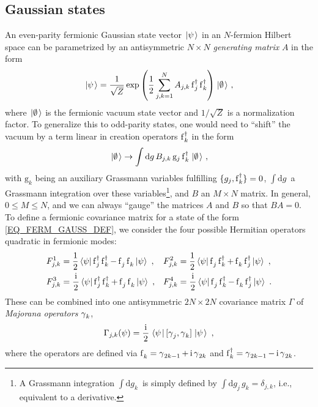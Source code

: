 \documentclass[letter]{article}
\newcommand{\intd}[1]{\int\mathrm{d}#1\,}
\begin{document}
\subsection{Gaussian states}
An even-parity fermionic Gaussian state vector $\left.\left|{\psi}\right.\right\rangle$ in an $N$-fermion Hilbert space can be parametrized by an antisymmetric $N \times N$ \emph{generating matrix} $A$ in the form
\begin{equation}
\label{EQ_FERM_GAUSS_DEF}
\left.\left|{\psi}\right.\right\rangle = \frac{1}{\sqrt{Z}} \exp\left( \frac{1}{2} \sum_{j,k=1}^N A_{j,k} \operatorname{f}^\dagger_j \operatorname{f}^\dagger_k \right) {\left.\left|{\emptyset}\right.\right\rangle} \ ,
\end{equation}
where ${\left.\left|{\emptyset}\right.\right\rangle}$ is the fermionic vacuum state vector and $1/\sqrt{Z}$ is a normalization factor. To generalize this to odd-parity states, one would need to ``shift'' the vacuum by a term linear in creation operators $\operatorname{f}^\dagger_k$ in the form
\begin{equation}
\vacket \to \intd g B_{j,k}\, \mathrm{g}_j \fd_k \vacket \ ,
\end{equation}
with $\mathrm{g}_k$ being an auxiliary Grassmann variables fulfilling $\{ g_j, \operatorname{f}^\dagger_k \} = 0$, $\intd g$ a Grassmann integration over these variables\footnote{A Grassmann integration $\intd{g_k}$ is simply defined by $\intd{g_j} g_k = \delta_{j,k}$, i.e., equivalent to a derivative.}, and $B$ an $M \times N$ matrix. In general, $0 \leq M \leq N$, and we can always ``gauge'' the matrices $A$ and $B$ so that $B A = 0$. 
To define a fermionic covariance matrix for a state of the form \eqref{EQ_FERM_GAUSS_DEF}, we consider the four possible Hermitian operators quadratic in fermionic modes:
\begin{equation}
\begin{aligned}
F^1_{j,k} &= \frac{1}{2}\sandwich{\psi}{\fd_j \fd_k - \fe_j \fe_k}{\psi} \ , &
F^2_{j,k} &= \frac{1}{2}\sandwich{\psi}{\fe_j \fd_k + \fe_k \fd_j}{\psi} \ , \\
F^3_{j,k} &= \frac{\i\,}{2}\sandwich{\psi}{\fd_j \fd_k + \fe_j \fe_k}{\psi}  \ , &
F^4_{j,k} &= \frac{\i\,}{2}\sandwich{\psi}{\fe_j \fd_k - \fe_k \fd_j}{\psi} \ .
\end{aligned}
\end{equation}
These can be combined into one antisymmetric $2N \times 2N$ covariance matrix $\Gamma$ of \emph{Majorana operators} $\operatorname{\gamma}_k$,
\begin{equation}
\Gamma_{j,k}(\psi) = \frac{\,\mathrm{i}\,}{2} \left.\left\langle{\psi}\right.\right| [\operatorname{\gamma}_j,\operatorname{\gamma}_k]\left.\left|{\psi}\right.\right\rangle \ ,
\end{equation}
where the operators are defined via $\fe_k = \m_{2k-1} + \i \m_{2k}$ and  $\operatorname{f}^\dagger_k = \operatorname{\gamma}_{2k-1} - \,\mathrm{i} \operatorname{\gamma}_{2k}$.
\end{document}
